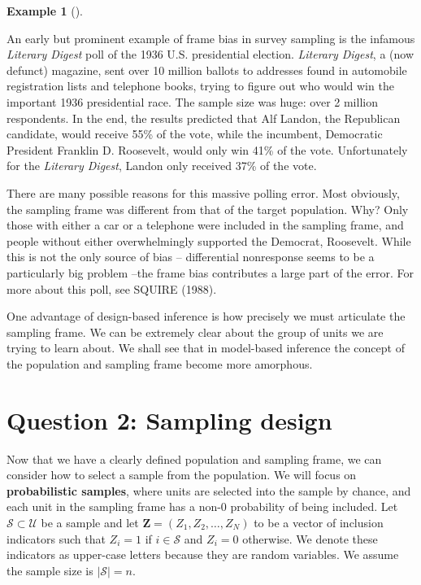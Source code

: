\documentclass[
  letterpaper,
  DIV=11,
  numbers=noendperiod]{scrreprt}
\newcommand{\mb}{\symbf}
\theoremstyle{definition}
\newtheorem{example}{Example}[chapter]
\theoremstyle{definition}
\theoremstyle{plain}
\theoremstyle{remark}
\begin{document}
\begin{example}[]\protect\hypertarget{exm-frame-bias}{}\label{exm-frame-bias}

An early but prominent example of frame bias in survey sampling is the
infamous \emph{Literary Digest} poll of the 1936 U.S. presidential
election. \emph{Literary Digest}, a (now defunct) magazine, sent over 10
million ballots to addresses found in automobile registration lists and
telephone books, trying to figure out who would win the important 1936
presidential race. The sample size was huge: over 2 million respondents.
In the end, the results predicted that Alf Landon, the Republican
candidate, would receive 55\% of the vote, while the incumbent,
Democratic President Franklin D. Roosevelt, would only win 41\% of the
vote. Unfortunately for the \emph{Literary Digest}, Landon only received
37\% of the vote.

There are many possible reasons for this massive polling error. Most
obviously, the sampling frame was different from that of the target
population. Why? Only those with either a car or a telephone were
included in the sampling frame, and people without either overwhelmingly
supported the Democrat, Roosevelt. While this is not the only source of
bias -- differential nonresponse seems to be a particularly big problem
--the frame bias contributes a large part of the error. For more about
this poll, see SQUIRE (1988).

\end{example}

One advantage of design-based inference is how precisely we must
articulate the sampling frame. We can be extremely clear about the group
of units we are trying to learn about. We shall see that in model-based
inference the concept of the population and sampling frame become more
amorphous.

\hypertarget{question-2-sampling-design}{%
\section{Question 2: Sampling design}\label{question-2-sampling-design}}

Now that we have a clearly defined population and sampling frame, we can
consider how to select a sample from the population. We will focus on
\textbf{probabilistic samples}, where units are selected into the sample
by chance, and each unit in the sampling frame has a non-0 probability
of being included. Let \(\mathcal{S} \subset \mathcal{U}\) be a sample
and let \(\mb{Z} = (Z_1, Z_2, \ldots, Z_N)\) to be a vector of inclusion
indicators such that \(Z_i = 1\) if \(i \in \mathcal{S}\) and
\(Z_i = 0\) otherwise. We denote these indicators as upper-case letters
because they are random variables. We assume the sample size is
\(|\mathcal{S}| = n\).
\end{document}
